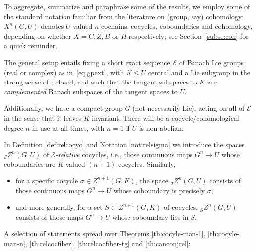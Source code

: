 \documentclass[pdftex]{sigma}
\numberwithin{equation}{section}
\newcommand\cE{{\mathcal E}}
\begin{document}
To aggregate, summarize and paraphrase some of the results, we employ some of the standard notation familiar from the literature on (group, say) cohomology: $X^{n}(G,U)$ denotes $U$-valued $n$-cochains, cocycles, coboundaries and cohomology, depending on whether $X = C,Z,B$ or $H$ respectively; see Section~\ref{subse:coh} for a quick reminder.

The general setup entails fixing a short exact sequence $\cE$ of Banach Lie groups (real or complex) as in~\eqref{eq:gpext}, with $K\le U$ central and a Lie subgroup in the strong sense of \cite[Section~III.1.3, Definition~3]{bourb-lie-13}; closed, and such that the tangent subspaces to $K$ are {\it complemented} Banach subspaces of the tangent spaces to $U$.

Additionally, we have a compact group $G$ (not necessarily Lie), acting on all of $\cE$ in the sense that it leaves $K$ invariant. There will be a cocycle/cohomological degree $n$ in use at all times, with $n=1$ if $U$ is non-abelian.

In Definition \ref{def:relcocyc} and Notation \ref{not:relsigma} we introduce the spaces ${}_{\cE}Z^n(G,U)$ of {\it $\cE$-relative} cocycles, i.e., those continuous maps $G^n\to U$ whose coboundaries are $K$-valued $(n+1)$-cocycles. Similarly,
\begin{itemize}\itemsep=0pt
\item for a specific cocycle $\sigma\in Z^{n+1}(G,K)$, the space ${}_{\sigma}Z^n(G,U)$ consists of those continuous maps $G^n\to U$ whose coboundary is precisely $\sigma$;
\item and more generally, for a set $S\subset Z^{n+1}(G,K)$ of cocycles, ${}_{S}Z^n(G,U)$ consists of those maps $G^n\to U$ whose coboundary lies in $S$.
\end{itemize}

A selection of statements spread over Theorems \ref{th:cocyle-man-1}, \ref{th:cocyle-man-n}, \ref{th:relcocfiber}, \ref{th:relcocfiber-tg} and \ref{th:canconjrel}:
\end{document}
